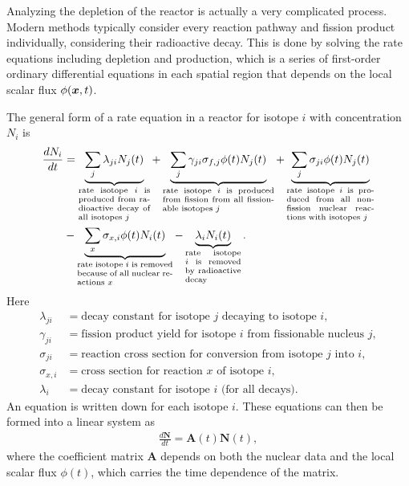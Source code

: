 Analyzing the depletion of the reactor is actually a very complicated process. Modern methods typically consider every reaction pathway and fission product individually, considering their radioactive decay. This is done by solving the rate equations including depletion and production, which is a series of first-order ordinary differential equations in each spatial region that depends on the local scalar flux $\phi(\bm{x},t)$. 

The general form of a rate equation in a reactor for isotope $i$ with concentration $N_i$ is
\begin{align}
  \frac{dN_i}{dt} &= 
  \underbrace{\sum_j \lambda_{ji} N_j(t) }_{\parbox{2.25cm}{\scriptsize rate isotope $i$ is produced from radioactive decay of all isotopes $j$}}
  + \underbrace{\sum_j \gamma_{ji} \sigma_{f,j} \phi(t) N_j(t)}_{\parbox{3.5cm}{\scriptsize rate isotope $i$ is produced from fission from all fissionable isotopes $j$}}
  + \underbrace{\sum_j \sigma_{ji} \phi(t) N_j(t)}_{\parbox{2.75cm}{\scriptsize rate isotope $i$ is produced from all non-fission nuclear reactions with isotopes $j$}} \nonumber \\
  &- \underbrace{\sum_x \sigma_{x,i} \phi(t) N_i(t)}_{\parbox{3cm}{\scriptsize rate isotope $i$ is removed because of all nuclear reactions $x$}}
  - \underbrace{\lambda_i N_i(t) }_{\parbox{1.75cm}{\scriptsize rate isotope $i$ is removed by radioactive decay}}.
\end{align}
Here
\begin{align}
  \lambda_{ji} &= \text{decay constant for isotope $j$ decaying to isotope $i$},  \nonumber \\
  \gamma_{ji}  &= \text{fission product yield for isotope $i$ from fissionable nucleus $j$}, \nonumber \\
  \sigma_{ji}  &= \text{reaction cross section for conversion from isotope $j$ into $i$}, \nonumber \\
  \sigma_{x,i} &= \text{cross section for reaction $x$ of isotope $i$}, \nonumber \\
  \lambda_i    &= \text{decay constant for isotope $i$ (for all decays)}. \nonumber 
\end{align}
An equation is written down for each isotope $i$. These equations can then be formed into a linear system as
\begin{align}
  \frac{d\mathbf{N}}{dt} = \mathbf{A}(t) \mathbf{N}(t) ,
\end{align}
where the coefficient matrix $\mathbf{A}$ depends on both the nuclear data and the local scalar flux $\phi(t)$, which carries the time dependence of the matrix. 

